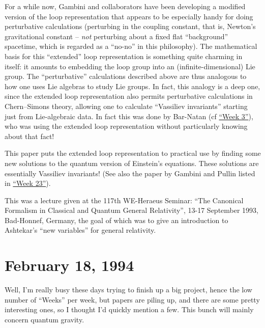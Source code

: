\documentclass[12pt]{article}
\def\tightlist{}
\renewcommand{\texttt}[1]{%
  \begingroup
  \ttfamily
  \begingroup\lccode`~=`/\lowercase{\endgroup\def~}{/\discretionary{}{}{}}%
  \begingroup\lccode`~=`[\lowercase{\endgroup\def~}{[\discretionary{}{}{}}%
  \begingroup\lccode`~=`.\lowercase{\endgroup\def~}{.\discretionary{}{}{}}%
  \catcode`/=\active\catcode`[=\active\catcode`.=\active
  \scantokens{#1\noexpand}%
  \endgroup
}
\begin{document}
For a while now, Gambini and collaborators have been developing a
modified version of the loop representation that appears to be
especially handy for doing perturbative calculations (perturbing in the
coupling constant, that is, Newton's gravitational constant --
\emph{not} perturbing about a fixed flat ``background'' spacetime, which
is regarded as a ``no-no'' in this philosophy). The mathematical basis
for this ``extended'' loop representation is something quite charming in
itself: it amounts to embedding the loop group into an
(infinite-dimensional) Lie group. The ``perturbative'' calculations
described above are thus analogous to how one uses Lie algebras to study
Lie groups. In fact, this analogy is a deep one, since the extended loop
representation also permits perturbative calculations in Chern--Simons
theory, allowing one to calculate ``Vassiliev invariants'' starting just
from Lie-algebraic data. In fact this was done by Bar-Natan (cf
\protect\hyperlink{week3}{``Week 3''}), who was using the extended loop
representation without particularly knowing about that fact!

This paper puts the extended loop representation to practical use by
finding some new solutions to the quantum version of Einstein's
equations. These solutions are essentially Vassiliev invariants! (See
also the paper by Gambini and Pullin listed in
\protect\hyperlink{week23}{``Week 23''}).


This was a lecture given at the 117th WE-Heraeus Seminar: ``The
Canonical Formalism in Classical and Quantum General Relativity'', 13-17
September 1993, Bad-Honnef, Germany, the goal of which was to give an
introduction to Ashtekar's ``new variables'' for general relativity.



\hypertarget{week31}{%
\section{February 18, 1994}\label{week31}}

Well, I'm really busy these days trying to finish up a big project,
hence the low number of ``Weeks'' per week,
but papers are piling up, and there are some pretty interesting ones, so
I thought I'd quickly mention a few. This bunch will mainly concern
quantum gravity.
\end{document}
